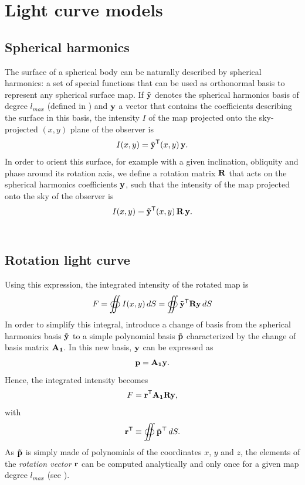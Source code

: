 \documentclass[modern]{aastex631}
\begin{document}
\newpage
\section{Light curve models}\label{starry}
\subsection{Spherical harmonics}

The surface of a spherical body can be naturally described by spherical harmonics: a set of special functions that can be used as orthonormal basis to represent any spherical surface map. If ${\mathbf{\tilde y}}$ denotes the spherical harmonics basis of degree $l_{max}$ (defined in \citealt[section X]{starry}) and ${\mathbf{y}}$ a vector that contains the coefficients describing the surface in this basis, the intensity $I$ of the map projected onto the sky-projected $(x, y)$ plane of the observer is
$$I(x, y) = {\mathbf{\tilde y}}^\mathsf{T}(x, y) \, {\mathbf{y}}.$$
In order to orient this surface, for example with a given inclination, obliquity and phase around its rotation axis, we define a rotation matrix ${\mathbf{R}}$ that acts on the spherical harmonics coefficients ${\mathbf{y}}$, such that the intensity of the map projected onto the sky of the observer is
$$I(x, y) = {\mathbf{\tilde y}}^\mathsf{T}(x, y) \, {\mathbf{R}} \, {\mathbf{y}}.$$\\
\subsection{Rotation light curve}
Using this expression, the integrated intensity of the rotated map is
$$F = \oiint I(x,y)\,dS = \oiint {\ensuremath{\mathbf{\tilde y}}}^\mathsf{T}{\mathbf{R}}{\mathbf{y}}\,dS$$
In order to simplify this integral, \citealt{starry} introduce a change of basis from the spherical harmonics basis ${\mathbf{\tilde y}}$ to a simple polynomial basis ${\mathbf{\tilde p}}$ characterized by the change of basis matrix ${\mathbf{A_1}}$. In this new basis, ${\mathbf{y}}$ can be expressed as
$${\mathbf{p}} = {\mathbf{A_1}}{\mathbf{y}}.$$
Hence, the integrated intensity becomes
$$F = {\mathbf{r^\mathsf{T}}}{\mathbf{A_1}}{\mathbf{R}}{\mathbf{y}},$$
with
$${\mathbf{r^\mathsf{T}}} \equiv \oiint \mathbf{\tilde{p}}^\top\,dS.$$
As ${\mathbf{\tilde{p}}}$ is simply made of polynomials of the coordinates $x$, $y$ and $z$, the elements of the \textit{rotation vector} ${\mathbf{r}}$ can be computed analytically and only once for a given map degree $l_{max}$ (see \citealt[Eq. 20]{starry}).\\\\
\end{document}
